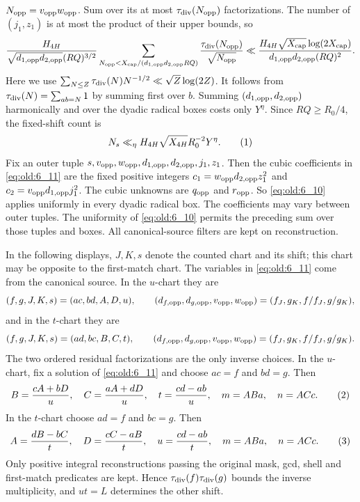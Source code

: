 \(N_{\rm opp}=v_{\rm opp}w_{\rm opp}\).  Sum over its at most
\(\tau_{\mathrm{div}}(N_{\rm opp})\) factorizations.  The number of \((j_1,z_1)\) is
at most the product of their upper bounds, so
\[
 \frac{H_{4H}}{\sqrt{d_{1,\rm opp}d_{2,\rm opp}}(RQ)^{3/2}}
 \sum_{N_{\rm opp}<X_{\rm cap}/(d_{1,\rm opp}d_{2,\rm opp}RQ)}
 \frac{\tau_{\mathrm{div}}(N_{\rm opp})}{\sqrt {N_{\rm opp}}}
 \ll \frac{H_{4H}\sqrt{X_{\rm cap}}\log(2X_{\rm cap})}
 {d_{1,\rm opp}d_{2,\rm opp}(RQ)^2}.
\]
Here we use $\sum_{N\le Z}\tau_{\mathrm{div}}(N)N^{-1/2}\ll\sqrt Z\log(2Z)$.  It
follows from $\tau_{\mathrm{div}}(N)=\sum_{ab=N}1$ by summing first over $b$.  Summing
\((d_{1,\rm opp},d_{2,\rm opp})\) harmonically and over the dyadic radical
boxes costs only \(Y^\eta\).  Since \(RQ\ge R_0/4\), the fixed-shift count
is
\[
 N_s\ll_\eta H_{4H}\sqrt{X_{4H}}R_0^{-2}Y^\eta.\AutoTag{eq:old:6_12}
\]
Fix an outer tuple
\(s,v_{\rm opp},w_{\rm opp},d_{1,\rm opp},d_{2,\rm opp},j_1,z_1\).
Then the cubic coefficients in \eqref{eq:old:6_11} are the fixed positive
integers \(c_1=w_{\rm opp}d_{2,\rm opp}z_1^2\) and
\(c_2=v_{\rm opp}d_{1,\rm opp}j_1^2\).
The cubic unknowns are \(q_{\rm opp}\) and \(r_{\rm opp}\).  So
\eqref{eq:old:6_10} applies uniformly in every dyadic radical box.
The coefficients may vary between outer tuples.  The uniformity of
\eqref{eq:old:6_10} permits the preceding sum over those tuples and boxes.
All canonical-source filters are kept on reconstruction.

In the following displays, \(J,K,s\) denote the counted chart and its
shift; this chart may be opposite to the first-match chart. The variables
in \eqref{eq:old:6_11} come from the canonical source. In the
$u$-chart they are
\[
 (f,g,J,K,s)=(ac,bd,A,D,u),
 \qquad (d_{f,\rm opp},d_{g,\rm opp},v_{\rm opp},w_{\rm opp})
 =(f_J,g_K,f/f_J,g/g_K),
\]
and in the $t$-chart they are
\[
 (f,g,J,K,s)=(ad,bc,B,C,t),
 \qquad (d_{f,\rm opp},d_{g,\rm opp},v_{\rm opp},w_{\rm opp})
 =(f_J,g_K,f/f_J,g/g_K).
\]
The two ordered residual factorizations are the only inverse choices.  In
the $u$-chart, fix a solution of \eqref{eq:old:6_11} and choose $ac=f$ and
$bd=g$.  Then
\[
 B=\frac{cA+bD}{u},\quad C=\frac{aA+dD}{u},\quad
 t=\frac{cd-ab}{u},\quad m=ABa,\quad n=ACc.                 \AutoTag{eq:old:6_12a}
\]
In the $t$-chart choose $ad=f$ and $bc=g$.  Then
\[
 A=\frac{dB-bC}{t},\quad D=\frac{cC-aB}{t},\quad
 u=\frac{cd-ab}{t},\quad m=ABa,\quad n=ACc.                 \AutoTag{eq:old:6_12b}
\]
Only positive integral reconstructions passing the original mask, gcd,
shell and first-match predicates are kept.  Hence
$\tau_{\mathrm{div}}(f)\tau_{\mathrm{div}}(g)$ bounds the inverse multiplicity, and $ut=L$
determines the other shift.

